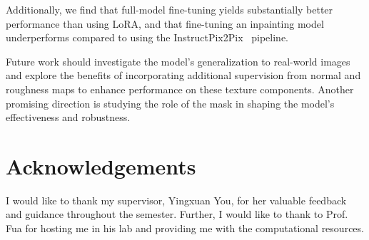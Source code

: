 \documentclass[11pt,twocolumn]{article}
\begin{document}
Additionally, we find that full-model fine-tuning yields substantially better performance than using LoRA, 
and that fine-tuning an inpainting model underperforms compared to using the 
InstructPix2Pix~\cite{instructpix2pix} pipeline.

Future work should investigate the model's generalization to real-world images and explore the benefits 
of incorporating additional supervision from normal and roughness maps to enhance performance on these 
texture components. Another promising direction is studying the role of the mask in shaping the model's 
effectiveness and robustness.

\section{Acknowledgements}
I would like to thank my supervisor, Yingxuan You, for her valuable feedback and guidance throughout the semester. 
Further, I would like to thank to Prof. Fua for hosting me in his lab and providing me with the computational resources.


\newpage


\end{document}

